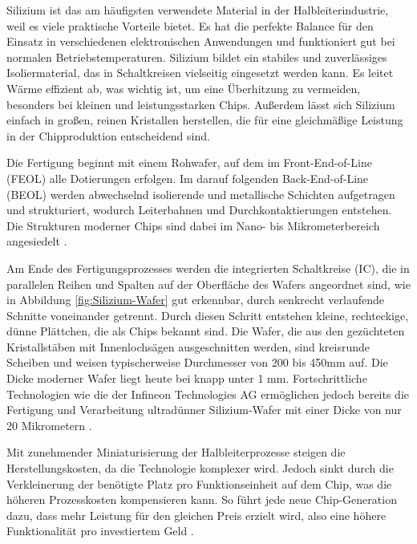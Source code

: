 Silizium ist das am häufigsten verwendete Material in der Halbleiterindustrie, weil es viele praktische Vorteile bietet. Es hat die perfekte Balance für den Einsatz in verschiedenen elektronischen Anwendungen und funktioniert gut bei normalen Betriebstemperaturen. Silizium bildet ein stabiles und zuverlässiges Isoliermaterial, das in Schaltkreisen vielseitig eingesetzt werden kann. Es leitet Wärme effizient ab, was wichtig ist, um eine Überhitzung zu vermeiden, besonders bei kleinen und leistungsstarken Chips. Außerdem lässt sich Silizium einfach in großen, reinen Kristallen herstellen, die für eine gleichmäßige Leistung in der Chipproduktion entscheidend sind.

Die Fertigung beginnt mit einem Rohwafer, auf dem im Front-End-of-Line (FEOL) alle Dotierungen erfolgen. Im darauf folgenden Back-End-of-Line (BEOL) werden abwechselnd isolierende und metallische Schichten aufgetragen und strukturiert, wodurch Leiterbahnen und Durchkontaktierungen entstehen. Die Strukturen moderner Chips sind dabei im Nano- bis Mikrometerbereich angesiedelt \cite{lienig2023halbleitertechnologie}.

Am Ende des Fertigungsprozesses werden die integrierten Schaltkreise (\gls{IC}), die in parallelen Reihen und Spalten auf der Oberfläche des Wafers angeordnet sind, wie in Abbildung \ref{fig:Silizium-Wafer} gut erkennbar, durch senkrecht verlaufende Schnitte voneinander getrennt. Durch diesen Schritt entstehen kleine, rechteckige, dünne Plättchen, die als Chips bekannt sind. Die Wafer, die aus den gezüchteten Kristallstäben mit Innenlochsägen ausgeschnitten werden, sind kreisrunde Scheiben und weisen typischerweise Durchmesser von 200 bis 450mm auf. Die Dicke moderner Wafer liegt heute bei knapp unter 1 mm. Fortschrittliche Technologien wie die der Infineon Technologies AG ermöglichen jedoch bereits die Fertigung und Verarbeitung ultradünner Silizium-Wafer mit einer Dicke von nur 20 Mikrometern \cite{infineon2024dünnsterWafer}.

Mit zunehmender Miniaturisierung der Halbleiterprozesse steigen die Herstellungskosten, da die Technologie komplexer wird. Jedoch sinkt durch die Verkleinerung der benötigte Platz pro Funktionseinheit auf dem Chip, was die höheren Prozesskosten kompensieren kann. So führt jede neue Chip-Generation dazu, dass mehr Leistung für den gleichen Preis erzielt wird, also eine höhere Funktionalität pro investiertem Geld \cite{lienig2023halbleitertechnologie}.